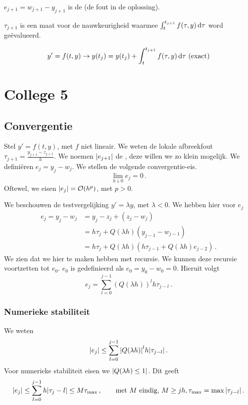 \documentclass{2wn20summary}
\begin{document}
			\begin{define}

				$e_{j+1}=w_{j+1}-y_{j+1}$ is de  (de fout in de oplossing).
			\end{define}
			$\tau_{j+1}$ is een maat voor de nauwkeurigheid waarmee $\int_t^{t_{j+1}} f(\tau,y) \mathop{}\!\mathrm{d} \tau$ word ge\"evalueerd.

			\[
				y'=f(t,y) \to y(t_j) = y(t_j) + \int_t^{t_{j+1}} f(\tau,y) \mathop{}\!\mathrm{d} \tau \text{ (exact)}
			 \] %

	\newpage
	\section{College 5}
		\subsection{Convergentie}
		Stel $ y' = f(t,y) $, met $f$ niet lineair. We weten de lokale afbreekfout $ \tau_{j+1} = \frac{y_{j+1}-z_{j+1}}{h} $. We noemen $ {\left|e_{j+1}\right|} $ de , deze willen we zo klein mogelijk. We defini\"eren $ e_j=y_j-w_j $. We stellen de volgende convergentie-eis.
		\[ 
			\lim_{h \downarrow 0} e_j = 0 \,.
		\]
		Oftewel, we eisen $ {\left|e_j\right|} = \mathcal{O}(h^p) $, met $ p>0 $.
		
		We beschouwen de testvergelijking $ y' = \lambda y $, met $ \lambda < 0 $. We hebben hier voor $ e_j $
		\begin{align*}
			e_j = y_j - w_j &= y_j - z_j + (z_j - w_j) \\
				&= h\tau_j + Q(\lambda h) (y_{j-1}-w_{j-1}) \\
				&= h\tau_j + Q(\lambda h) (h\tau_{j-1} + Q(\lambda h)e_{j-2})\,.
		\end{align*}
		We zien dat we hier te maken hebben met recursie. We kunnen deze recursie voortzetten tot $ e_0 $. $ e_0$ is gedefinieerd als $ e_0 = y_0 - w_0 = 0 $. Hieruit volgt
		\[ 
			e_j = \sum_{l=0}^{j-1} (Q(\lambda h))^l h \tau_{j-l}\,.
		\]
		
		\subsubsection{Numerieke stabiliteit}
			We weten 
			\[ 
				{\left|e_j\right|} \le \sum_{l=0}^{j-1} {\left|Q(\lambda h)\right|}^l h {\left|\tau_{j-l}\right|}\,. 
			\]
			Voor numerieke stabiliteit eisen we $ {\left|Q(\lambda h) \le 1\right|} $. Dit geeft 
			\[ 
				{\left|e_j\right|} \le \sum_{l=0}^{j-1} h {\left|\tau_j-l\right|} \le M \tau_{\max}\,, \qquad \text{met $M$ eindig, } M \ge jh, \tau_{\max} = \max {\left|\tau_{j-l}\right|}\,.
			\]
\end{document}
